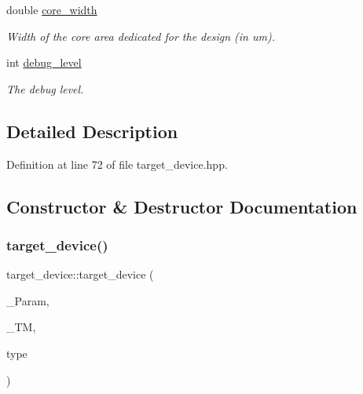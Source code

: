 \begin{DoxyCompactItemize}
double \hyperlink{classtarget__device_ae0180645e44114a173d1f6362a4c6426}{core\+\_\+width}
\begin{DoxyCompactList}\small\item\em Width of the core area dedicated for the design (in um). \end{DoxyCompactList}\item 
int \hyperlink{classtarget__device_a8b6c191a28f28f9f681a6b0fe2e8d1e1}{debug\+\_\+level}
\begin{DoxyCompactList}\small\item\em The debug level. \end{DoxyCompactList}\end{DoxyCompactItemize}


\subsection{Detailed Description}


Definition at line 72 of file target\+\_\+device.\+hpp.



\subsection{Constructor \& Destructor Documentation}
\mbox{\label{classtarget__device_af1125b9f691005573db32414f1c8c34f}} 
\subsubsection{\texorpdfstring{target\+\_\+device()}{target\_device()}}
{\footnotesize\ttfamily target\+\_\+device\+::target\+\_\+device (\begin{DoxyParamCaption}\item[{const \hyperlink{Parameter_8hpp_a37841774a6fcb479b597fdf8955eb4ea}{Parameter\+Const\+Ref} \&}]{\+\_\+\+Param,  }\item[{const \hyperlink{technology__manager_8hpp_a4b9ecd440c804109c962654f9227244e}{technology\+\_\+manager\+Ref} \&}]{\+\_\+\+TM,  }\item[{const \hyperlink{target__device_8hpp_a476becc690220f0805ce73006449c732}{Target\+Device\+\_\+\+Type}}]{type }\end{DoxyParamCaption})}



